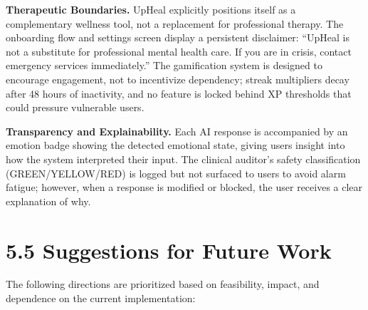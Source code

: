 \documentclass[
  letterpaper,
  12pt,
  a4paper,
  openany]{report}
\begin{document}
\textbf{Therapeutic Boundaries.} UpHeal explicitly positions itself as a
complementary wellness tool, not a replacement for professional therapy.
The onboarding flow and settings screen display a persistent disclaimer:
``UpHeal is not a substitute for professional mental health care. If you
are in crisis, contact emergency services immediately.'' The
gamification system is designed to encourage engagement, not to
incentivize dependency; streak multipliers decay after 48 hours of
inactivity, and no feature is locked behind XP thresholds that could
pressure vulnerable users.

\textbf{Transparency and Explainability.} Each AI response is
accompanied by an emotion badge showing the detected emotional state,
giving users insight into how the system interpreted their input. The
clinical auditor's safety classification (GREEN/YELLOW/RED) is logged
but not surfaced to users to avoid alarm fatigue; however, when a
response is modified or blocked, the user receives a clear explanation
of why.

\section{5.5 Suggestions for Future
Work}\label{suggestions-for-future-work}

The following directions are prioritized based on feasibility, impact,
and dependence on the current implementation:
\end{document}
